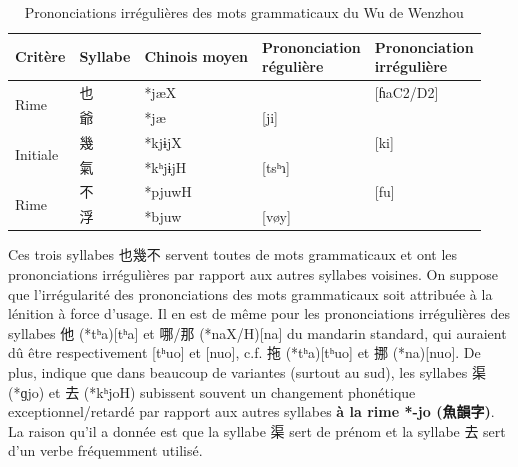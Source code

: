 \documentclass{scrbook}
\newcounter{c}[subsubsection]
\newcommand{\termyyx}[1]{\textbf{#1}}
\begin{document}
\begin{sloppypar}
\begin{table}[htbp]
  \centering
    \begin{tabular}{lllll}
    \toprule
    Critère & Syllabe & Chinois moyen  & \makecell{Prononciation\\ régulière} & \makecell{Prononciation\\ irrégulière} \\
    \midrule
    \multirow{2}[2]{*}{Rime} & \cellcolor[rgb]{ .851,  .851,  .851}也     & *jæX  &       & \multicolumn{1}{l}{[ɦaC2/D2]} \\
          & 爺     & *jæ   & [ji]  &  \\
    \midrule
    \multirow{2}[2]{*}{Initiale} & \cellcolor[rgb]{ .851,  .851,  .851}幾     & *kjɨjX &       & \multicolumn{1}{l}{[ki]} \\
          & 氣     & *kʰjɨjH & [tsʰɿ] &  \\
    \midrule
    \multirow{2}[2]{*}{Rime} & \cellcolor[rgb]{ .851,  .851,  .851}不     & *pjuwH &       & \multicolumn{1}{l}{[fu]} \\
          & 浮     & *bjuw & [vøy] &  \\
    \bottomrule
    \end{tabular}%
  \caption{Prononciations irrégulières des mots grammaticaux du Wu de Wenzhou}
  \label{tab:exemple_mot_gram}%
\end{table}%

Ces trois syllabes 也幾不 servent toutes de mots grammaticaux et ont les prononciations irrégulières par rapport aux autres syllabes voisines. On suppose que l'irrégularité des prononciations des mots grammaticaux soit attribuée à la lénition à force d'usage. Il en est de même pour les prononciations irrégulières des syllabes 他 (*tʰa)[tʰa] et 哪/那 (*naX/H)[na] du mandarin standard, qui auraient dû être respectivement [tʰuo] et [nuo], c.f. 拖 (*tʰa)[tʰuo] et 挪 (*na)[nuo]. De plus, \textcite[33]{Chen2003yu} indique que dans beaucoup de variantes (surtout au sud), les syllabes 渠 (*ɡjo) et 去 (*kʰjoH) subissent souvent un changement phonétique exceptionnel/retardé par rapport aux autres syllabes \termyyx{à la rime *-jo (魚韻字)}. La raison qu'il a donnée est que la syllabe 渠 sert de prénom et la syllabe 去 sert d'un verbe fréquemment utilisé. 


\end{sloppypar}
\end{document}
